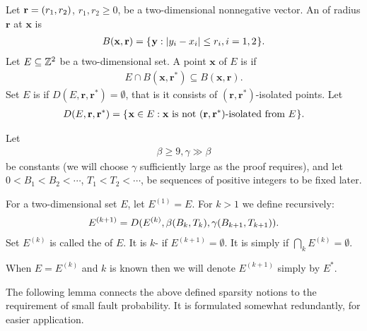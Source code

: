\documentclass[12pt]{memoir}
\renewcommand{\le}{\leq}
\renewcommand{\ge}{\geq}
\renewcommand{\vek}[1]{\mathbf{#1}}
\def\B{B}
\newcommand{\Tu}{T}
\begin{document}
\begin{definition}
Let \( \vek{r}=\pair{r_{1}}{r_{2}} \), \( r_{1}, r_{2}\ge 0 \),
be a two-dimensional nonnegative vector.
An  of radius \( \vek{r} \)  at \( \vek{x} \) is
\begin{align}\label{eq:ball1}
  B(\vek{x},\vek{r}) = \setOf{\vek{y}}{\abs{y_{i} - x_{i}} \le r_{i}, i=1,2}.
\end{align}  
Let \( E\subseteq \mathbb{Z}^{2} \) be a two-dimensional set.
A point \( \vek{x} \) of \( E \) is \df{\( \pair{\vek{r}}{\vek{r}^{*}} \)-isolated} if
\begin{align*}
  E \cap B(\vek{x},\vek{r}^{*})\subseteq B(\vek{x}, \vek{r}).
 \end{align*}
Set \( E \) is \df{\( (\vek{r}, \vek{r}^{*}) \)-sparse} 
if \( D(E, \vek{r}, \vek{r}^{*})=\emptyset \), that is 
it consists of \( (\vek{r}, \vek{r^{*}}) \)-isolated points.
Let
\begin{align}
  D(E,\vek{r}, \vek{r}^{*}) =
     \setOf{\vek{x}\in E}{\vek{x} \txt{ is not } (\vek{r}, \vek{r}^{*})\txt{-isolated
  from } E}.
\end{align}
\end{definition}

\begin{definition}[Sparsity]\label{def:sparsity}
Let
\begin{align}\label{eq:beta}
 \beta\ge 9, \gamma\gg\beta
 \end{align}
be constants (we will choose \( \gamma \) sufficiently large as the proof requires), and let 
\( 0<\B_{1}<\B_{2}<\dotsm \), \( \Tu_{1}<\Tu_{2}<\dotsm \), 
be sequences of positive integers to be fixed later.

For a two-dimensional set \( E \), let \( E^{(1)} = E \).
For \( k>1 \) we define recursively:
\begin{align}\label{eq:noise^k}
    E^{(k+1)} = D(E^{(k)}, \beta\pair{\B_{k}}{\Tu_{k}}, \gamma\pair{\B_{k+1}}{\Tu_{k+1}}).
\end{align}
Set \( E^{(k)} \) is called the  of \( E \).
It is \( k \)- if \( E^{(k+1)}=\emptyset \).
It is simply  if \( \bigcap_{k}E^{(k)}=\emptyset \).

When \( E=E^{(k)} \) and \( k \) is known
then we will denote \( E^{(k+1)} \) simply by \( E^{*} \).
\end{definition}

The following lemma connects the above defined sparsity notions to the requirement
of small fault probability.
It is formulated somewhat redundantly, for easier application.
\end{document}
